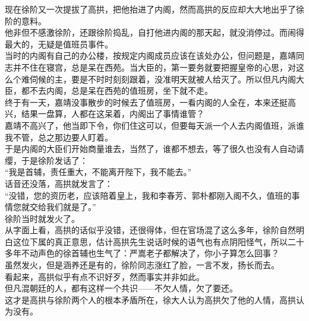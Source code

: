 \begin{multicols}{\theparacolNo}
现在徐阶又一次提拔了高拱，把他抬进了内阁，然而高拱的反应却大大地出乎了徐阶的意料。\\

他非但不感激徐阶，还跟徐阶捣乱，自打他进内阁的那天起，就没消停过。而闹得最大的，无疑是值班员事件。\\

当时的内阁有自己的办公楼，按规定内阁成员应该在该处办公，但问题是，嘉靖同志并不住在寝宫，总是呆在西苑。当大臣的，第一要务就要把握皇帝的心思，对这么个难伺候的主，要是不时时刻刻跟着，没准明天就被人给灭了。所以但凡内阁大臣，都不去内阁，总是呆在西苑的值班房，坐下就不走。\\

终于有一天，嘉靖没事散步的时候去了值班房，一看内阁的人全在，本来还挺高兴，结果一盘算，人都在这呆着，内阁出了事情谁管？\\

嘉靖不高兴了，他当即下令，你们住这可以，但要每天派一个人去内阁值班，派谁我不管，总之那边要人盯着。\\

于是内阁的大臣们开始商量谁去，当然了，谁都不想去，等了很久也没有人自动请缨，于是徐阶发话了：\\

“我是首辅，责任重大，不能离开陛下，我不能去。”\\

话音还没落，高拱就发言了：\\

“没错，您的资历老，应该陪着皇上，我和李春芳、郭朴都刚入阁不久，值班的事情您就交给我们就是了。”\\

徐阶当时就发火了。\\

从字面上看，高拱的话似乎没错，还很得体，但在官场混了这么多年，徐阶自然明白这位下属的真正意思，估计高拱先生说话时候的语气也有点阴阳怪气，所以二十多年不动声色的徐首辅也生气了：严嵩老子都解决了，你小子算怎么回事？\\

虽然发火，但是涵养还是有的，徐阶同志涨红了脸，一言不发，扬长而去。\\

看起来，高拱似乎有点不识好歹，然而事实并非如此。\\

但凡混朝廷的人，都有这样一个共识——不欠人情，欠了要还。\\

这才是高拱与徐阶两个人的根本矛盾所在，徐大人认为高拱欠了他的人情，高拱认为没有。\\


\end{multicols}
